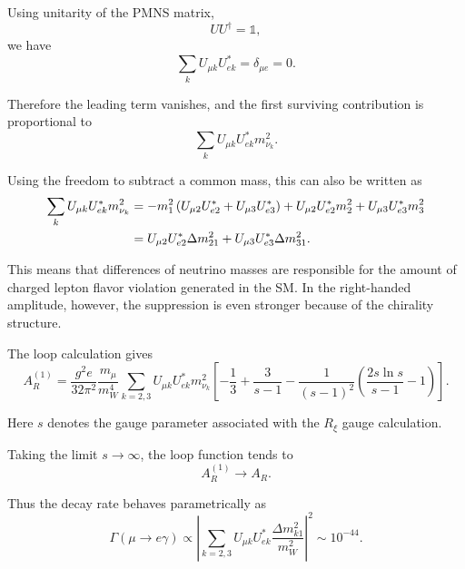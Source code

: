 \documentclass[11pt]{article}
\begin{document}
Using unitarity of the PMNS matrix,
\begin{equation}
    UU^\dagger = \mathbb{1},
\end{equation}
we have
\begin{equation}
    \sum_k U_{\mu k}U^*_{ek} = \delta_{\mu e}=0.
\end{equation}

Therefore the leading term vanishes, and the first surviving contribution is proportional to
\begin{equation}
    \sum_k U_{\mu k}U^*_{ek}m_{\nu_k}^2.
\end{equation}

Using the freedom to subtract a common mass, this can also be written as
\begin{align}
    \sum_k U_{\mu k}U^*_{ek}m_{\nu_k}^2
    &=
    -m_1^2
    \left(
        U_{\mu 2}U^*_{e2}
        +
        U_{\mu 3}U^*_{e3}
    \right)
    +
    U_{\mu 2}U^*_{e2}m_2^2
    +
    U_{\mu 3}U^*_{e3}m_3^2
    \notag \\
    &=
    U_{\mu 2}U^*_{e2}\Delta m_{21}^2
    +
    U_{\mu 3}U^*_{e3}\Delta m_{31}^2.
\end{align}

This means that differences of neutrino masses are responsible for the amount of charged lepton flavor violation generated in the SM. In the right-handed amplitude, however, the suppression is even stronger because of the chirality structure.

The loop calculation gives
\begin{equation}
    A^{(1)}_R
    =
    \frac{g^2 e}{32\pi^2}
    \frac{m_\mu}{m_W^4}
    \sum_{k=2,3}
    U_{\mu k}U^*_{ek}m_{\nu_k}^2
    \left[
        -\frac{1}{3}
        +
        \frac{3}{s-1}
        -
        \frac{1}{(s-1)^2}
        \left(
            \frac{2s\ln s}{s-1}
            -1
        \right)
    \right].
\end{equation}

Here $s$ denotes the gauge parameter associated with the $R_\xi$ gauge calculation.

Taking the limit $s \to \infty$, the loop function tends to
\begin{equation}
    A_R^{(1)} \to A_R.
\end{equation}

Thus the decay rate behaves parametrically as
\begin{equation}
    \Gamma(\mu \to e\gamma)
    \propto
    \left|
        \sum_{k=2,3}
        U_{\mu k}U^*_{ek}
        \frac{\Delta m_{k1}^2}{m_W^2}
    \right|^2
    \sim 10^{-44}.
\end{equation}
\end{document}
